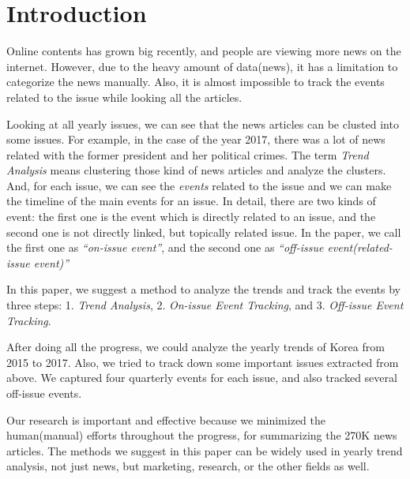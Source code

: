 \section{Introduction}

Online contents has grown big recently,
and people are viewing more news on the internet.
However, due to the heavy amount of data(news),
it has a limitation to categorize the news manually.
Also, it is almost impossible to track the events
related to the issue while looking all the articles.

Looking at all yearly issues,
we can see that the news articles can be clusted
into some issues.
For example, in the case of the year 2017,
there was a lot of news related with the former president
and her political crimes.
The term \textit{Trend Analysis} means
clustering those kind of news articles and analyze the clusters. 
And, for each issue, we can see the \textit{events} related to the issue
and we can make the timeline of the main events for an issue.
In detail, there are two kinds of event: the first one is
the event which is directly related to an issue,
and the second one is not directly linked, but topically related issue.
In the paper, we call the first one as \textit{``on-issue event''},
and the second one as \textit{``off-issue event(related-issue event)''}

In this paper, we suggest a method to analyze the trends
and track the events by three steps: 1. \textit{Trend Analysis},
2. \textit{On-issue Event Tracking}, and 3. \textit{Off-issue Event Tracking}.

After doing all the progress,
we could analyze the yearly trends of Korea from 2015 to 2017. 
Also, we tried to track down some important issues extracted from above.
We captured four quarterly events for each issue,
and also tracked several off-issue events.

Our research is important and effective because we minimized the human(manual) efforts
throughout the progress, for summarizing the 270K news articles.
The methods we suggest in this paper can be widely used in
yearly trend analysis, not just news, but marketing, research, or the other fields as well.